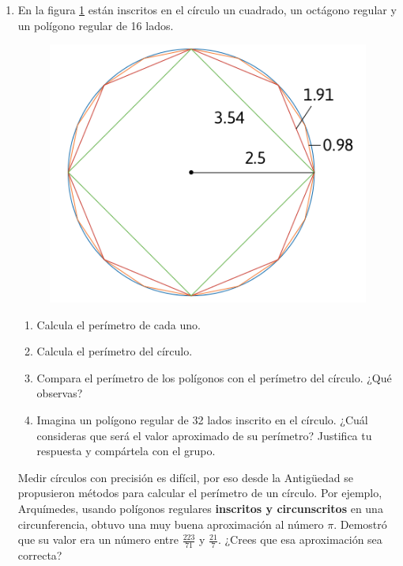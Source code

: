 \documentclass[11pt]{book}
\begin{document}
\begin{enumerate}
  \item En la figura \ref{fig:polygons_inside} están inscritos en el círculo un cuadrado,
        un octágono regular y un polígono regular de 16 lados.

        \begin{minipage}{0.3\textwidth}
          \begin{figure}[H]
            \centering
            \includegraphics[width=\linewidth]{polygons_inside.png}
            \label{fig:polygons_inside}
          \end{figure}
        \end{minipage}\hfill
        \begin{minipage}{0.7\textwidth}
          \begin{enumerate}
            \item Calcula el perímetro de cada uno.
            \item Calcula el perímetro del círculo.
            \item Compara el perímetro de los polígonos con el perímetro del círculo. ¿Qué observas?
            \item Imagina un polígono regular de 32 lados inscrito en el círculo. ¿Cuál consideras
                  que será el valor aproximado de su perímetro? Justifica tu respuesta y compártela con el grupo.
          \end{enumerate}
        \end{minipage}

        \begin{boxH}
          Medir círculos con precisión es difícil, por eso desde la Antigüedad se propusieron
          métodos para calcular el perímetro de un círculo. Por ejemplo, Arquímedes, usando
          polígonos regulares \textbf{\color{cyan}inscritos y circunscritos} en una circunferencia, obtuvo una muy
          buena aproximación al número $\pi$. Demostró que su valor era un número entre $\frac{223}{71}$ y $\frac{21}{7}$.
          ¿Crees que esa aproximación sea correcta?
        \end{boxH}


\end{enumerate}
\end{document}
